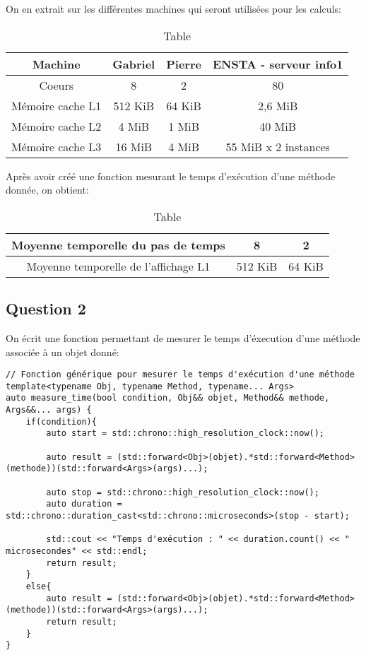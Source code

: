 \documentclass[a4paper, 12pt]{report}
\begin{document}
On en extrait sur les différentes machines qui seront utilisées pour les calculs:
\begin{table}[h]
  \centering
  \begin{tabular}{|c|c|c|c|}
    \hline
    Machine          & Gabriel & Pierre & ENSTA - serveur info1 \\ \hline
    Coeurs           & 8       & 2      & 80                    \\ \hline
    Mémoire cache L1 & 512 KiB & 64 KiB & 2,6 MiB               \\ \hline
    Mémoire cache L2 & 4 MiB   & 1 MiB  & 40 MiB                \\ \hline
    Mémoire cache L3 & 16 MiB  & 4 MiB  & 55 MiB x 2 instances  \\ \hline
  \end{tabular}
  \caption{Table}
  \label{tab:3x3_table}
\end{table}

Après avoir créé une fonction mesurant le temps d'exécution d'une méthode donnée, on obtient:
\begin{table}[h]
  \centering
  \begin{tabular}{|c|c|c|}
    \hline
    Moyenne temporelle du pas de temps   & 8       & 2      \\ \hline
    Moyenne temporelle de l'affichage L1 & 512 KiB & 64 KiB \\ \hline
  \end{tabular}
  \caption{Table}
  \label{tab:3x3_table}
\end{table}
\subsection{Question 2}

On écrit une fonction permettant de mesurer le temps d'éxecution d'une méthode associée à un objet donné:
\begin{verbatim}
// Fonction générique pour mesurer le temps d'exécution d'une méthode
template<typename Obj, typename Method, typename... Args>
auto measure_time(bool condition, Obj&& objet, Method&& methode, Args&&... args) {
    if(condition){
        auto start = std::chrono::high_resolution_clock::now();
    
        auto result = (std::forward<Obj>(objet).*std::forward<Method>(methode))(std::forward<Args>(args)...);
    
        auto stop = std::chrono::high_resolution_clock::now();
        auto duration = std::chrono::duration_cast<std::chrono::microseconds>(stop - start);
    
        std::cout << "Temps d'exécution : " << duration.count() << " microsecondes" << std::endl;
        return result;
    }
    else{
        auto result = (std::forward<Obj>(objet).*std::forward<Method>(methode))(std::forward<Args>(args)...);
        return result;
    }
}
\end{verbatim}
\end{document}
